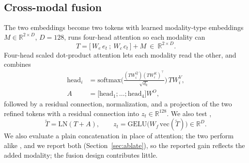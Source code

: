 \documentclass[journal]{IEEEtran}
\providecommand{\DIFaddtex}[1]{{\protect\color{blue} \sf #1}} %
\providecommand{\DIFdeltex}[1]{{\protect\color{red} \scriptsize #1}} %
\providecommand{\DIFaddbegin}{} %
\providecommand{\DIFaddend}{} %
\providecommand{\DIFdelbegin}{} %
\providecommand{\DIFdelend}{} %
\providecommand{\DIFadd}[1]{\texorpdfstring{\DIFaddtex{#1}}{#1}} %
\providecommand{\DIFdel}[1]{\texorpdfstring{\DIFdeltex{#1}}{}} %
\providecommand{\DIFscaledelfig}{0.5}
\newlength{\DIFdelgraphicswidth} %
\newlength{\DIFdelgraphicsheight} %
\providecommand{\DIFaddincludegraphics}[2][]{{\color{blue}\fbox{\DIFOincludegraphics[#1]{#2}}}} %
\providecommand{\DIFdelincludegraphics}[2][]{%
\sbox{\DIFdelgraphicsbox}{\DIFOincludegraphics[#1]{#2}}%
\settoboxwidth{\DIFdelgraphicswidth}{\DIFdelgraphicsbox} %
\settoboxtotalheight{\DIFdelgraphicsheight}{\DIFdelgraphicsbox} %
\scalebox{\DIFscaledelfig}{%
\parbox[b]{\DIFdelgraphicswidth}{\usebox{\DIFdelgraphicsbox}\\[-\baselineskip] \rule{\DIFdelgraphicswidth}{0em}}\llap{\resizebox{\DIFdelgraphicswidth}{\DIFdelgraphicsheight}{%
\setlength{\unitlength}{\DIFdelgraphicswidth}%
\begin{picture}(1,1)%
\thicklines\linethickness{2pt} %
{\color[rgb]{1,0,0}\put(0,0){\framebox(1,1){}}}%
{\color[rgb]{1,0,0}\put(0,0){\line( 1,1){1}}}%
{\color[rgb]{1,0,0}\put(0,1){\line(1,-1){1}}}%
\end{picture}%
}\hspace*{3pt}}} %
} %
\DeclareRobustCommand{\DIFaddbegin}{\DIFOaddbegin \let\includegraphics\DIFaddincludegraphics} %
\DeclareRobustCommand{\DIFaddend}{\DIFOaddend \let\includegraphics\DIFOincludegraphics} %
\DeclareRobustCommand{\DIFdelbegin}{\DIFOdelbegin \let\includegraphics\DIFdelincludegraphics} %
\DeclareRobustCommand{\DIFdelend}{\DIFOaddend \let\includegraphics\DIFOincludegraphics} %
\begin{document}
\subsection{\DIFadd{Cross-modal fusion}}
\DIFadd{The two embeddings become two tokens with }\DIFaddend learned modality-type embeddings
\DIFaddbegin \DIFadd{$M\in\mathbb{R}^{2\times D}$, $D=128$}\DIFaddend ,
\DIFdelbegin \DIFdel{runs four-head attention so each modality can }\DIFdelend \DIFaddbegin \begin{equation}
T=\big[\,W_e\,e_t\ ;\ W_c\,c_t\,\big]+M\ \in\ \mathbb{R}^{2\times D}.
\end{equation}
\DIFadd{Four-head scaled dot-product attention lets each modality }\DIFaddend read the other,
\DIFdelbegin \DIFdel{and combines }\DIFdelend \DIFaddbegin \begin{equation}
\begin{aligned}
\mathrm{head}_i&=\mathrm{softmax}\!\Big(\tfrac{(TW^Q_i)(TW^K_i)^{\!\top}}{\sqrt{d_k}}\Big)\,TW^V_i, \\
A&=\big[\mathrm{head}_1;\dots;\mathrm{head}_4\big]W^O,
\end{aligned}
\end{equation}
\DIFadd{followed by a residual connection, normalization, and a projection of }\DIFaddend the two refined tokens\DIFdelbegin \DIFdel{with a residual connection into $z_t\in\mathbb{R}^{128}$. We also test }\DIFdelend \DIFaddbegin \DIFadd{,
}\begin{equation}
\tilde T=\mathrm{LN}(T+A),\qquad z_t=\mathrm{GELU}\!\big(W_f\,\mathrm{vec}(\tilde T)\big)\in\mathbb{R}^{D}.
\end{equation}
\DIFadd{We also evaluate }\DIFaddend a plain concatenation in place of attention; the two perform alike
\DIFdelbegin \DIFdel{, and we report both}\DIFdelend \DIFaddbegin \DIFadd{(Section~\ref{sec:ablate}), so the reported gain reflects the added modality; the fusion design
contributes little}\DIFaddend .
\end{document}
